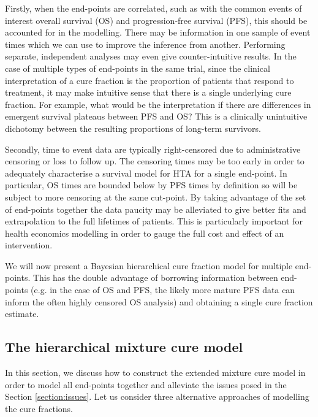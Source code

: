 \documentclass[AMA,STIX1COL]{WileyNJD-v2}
\begin{document}
Firstly, when the end-points are correlated, such as with the common events of interest overall survival (OS) and progression-free survival (PFS), this should be accounted for in the modelling.
There may be information in one sample of event times which we can use to improve the inference from another.
Performing separate, independent analyses may even give counter-intuitive results.
In the case of multiple types of end-points in the same trial, since the clinical interpretation of a cure fraction is the proportion of patients that respond to treatment,
it may make intuitive sense that there is a single underlying cure fraction.
For example, what would be the interpretation if there are differences in emergent survival plateaus between PFS and OS?
This is a clinically unintuitive dichotomy between the resulting proportions of long-term survivors.

Secondly, time to event data are typically right-censored due to administrative censoring or loss to follow up.
The censoring times may be too early in order to adequately characterise a survival model for HTA for a single end-point.
In particular, OS times are bounded below by PFS times by definition so will be subject to more censoring at the same cut-point.
By taking advantage of the set of end-points together the data paucity may be alleviated to give better fits and extrapolation to the full lifetimes of patients.
This is particularly important for health economics modelling in order to gauge the full cost and effect of an intervention.

We will now present a Bayesian hierarchical cure fraction model for multiple end-points.
This has the double advantage of borrowing information between end-points
(e.g. in the case of OS and PFS, the likely more mature PFS data can inform the often highly censored OS analysis) and obtaining a single cure fraction estimate.


%
\subsection{The hierarchical mixture cure model} \label{section:hier_model}
In this section, we discuss how to construct the extended mixture cure model in order to model all end-points together and alleviate the issues posed in the Section \ref{section:issues}.
Let us consider three alternative approaches of modelling the cure fractions. 
\end{document}
